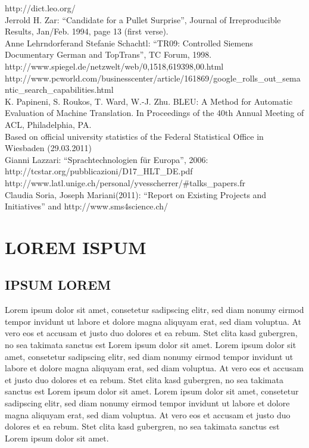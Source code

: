 \documentclass[]{../metanetpaper}
\begin{document}
 http://dict.leo.org/\\
 Jerrold H. Zar: “Candidate for a Pullet Surprise”, Journal of Irreproducible Results, Jan/Feb. 1994, page 13 (first verse). \\
 Anne Lehrndorferand Stefanie Schachtl: “TR09: Controlled Siemens Documentary German and TopTrans”, TC Forum, 1998.\\
 http://www.spiegel.de/netzwelt/web/0,1518,619398,00.html\\
 http://www.pcworld.com/businesscenter/article/161869/google\_rolls\_out\_semantic\_search\_capabilities.html\\
 K. Papineni, S. Roukos, T. Ward, W.-J. Zhu. BLEU: A Method for Automatic Evaluation of Machine Translation. In Proceedings of the 40th Annual Meeting of ACL, Philadelphia, PA.\\
 Based on official university statistics of the Federal Statistical Office in  Wiesbaden (29.03.2011)\\
 Gianni Lazzari: “Sprachtechnologien für Europa”, 2006:  http://tcstar.org/pubblicazioni/D17\_HLT\_DE.pdf \\
 http://www.latl.unige.ch/personal/yvesscherrer/\#talks\_papers.fr \\
  Claudia Soria, Joseph Mariani(2011): “Report on Existing Projects and Initiatives” and http://www.sms4science.ch/\\

\section{LOREM ISPUM}
\subsection{IPSUM LOREM}
Lorem ipsum dolor sit amet, consetetur sadipscing elitr, sed diam nonumy eirmod tempor invidunt ut labore et dolore magna aliquyam erat, sed diam voluptua. At vero eos et accusam et justo duo dolores et ea rebum. Stet clita kasd gubergren, no sea takimata sanctus est Lorem ipsum dolor sit amet. Lorem ipsum dolor sit amet, consetetur sadipscing elitr, sed diam nonumy eirmod tempor invidunt ut labore et dolore magna aliquyam erat, sed diam voluptua. At vero eos et accusam et justo duo dolores et ea rebum. Stet clita kasd gubergren, no sea takimata sanctus est Lorem ipsum dolor sit amet. Lorem ipsum dolor sit amet, consetetur sadipscing elitr, sed diam nonumy eirmod tempor invidunt ut labore et dolore magna aliquyam erat, sed diam voluptua. At vero eos et accusam et justo duo dolores et ea rebum. Stet clita kasd gubergren, no sea takimata sanctus est Lorem ipsum dolor sit amet.   
\end{document}
